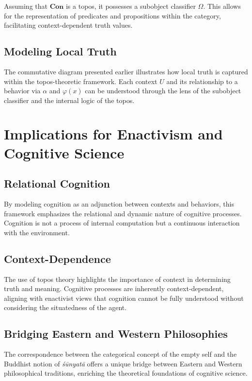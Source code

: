 \documentclass{article}
\begin{document}
Assuming that $\mathbf{Con}$ is a topos, it possesses a subobject classifier $\Omega$. This allows for the representation of predicates and propositions within the category, facilitating context-dependent truth values.

\subsection{Modeling Local Truth}

The commutative diagram presented earlier illustrates how local truth is captured within the topos-theoretic framework. Each context $U$ and its relationship to a behavior via $\alpha$ and $\varphi(x)$ can be understood through the lens of the subobject classifier and the internal logic of the topos.

\section{Implications for Enactivism and Cognitive Science}

\subsection{Relational Cognition}

By modeling cognition as an adjunction between contexts and behaviors, this framework emphasizes the relational and dynamic nature of cognitive processes. Cognition is not a process of internal computation but a continuous interaction with the environment.

\subsection{Context-Dependence}

The use of topos theory highlights the importance of context in determining truth and meaning. Cognitive processes are inherently context-dependent, aligning with enactivist views that cognition cannot be fully understood without considering the situatedness of the agent.

\subsection{Bridging Eastern and Western Philosophies}

The correspondence between the categorical concept of the empty self and the Buddhist notion of \emph{śūnyatā} offers a unique bridge between Eastern and Western philosophical traditions, enriching the theoretical foundations of cognitive science.
\end{document}

